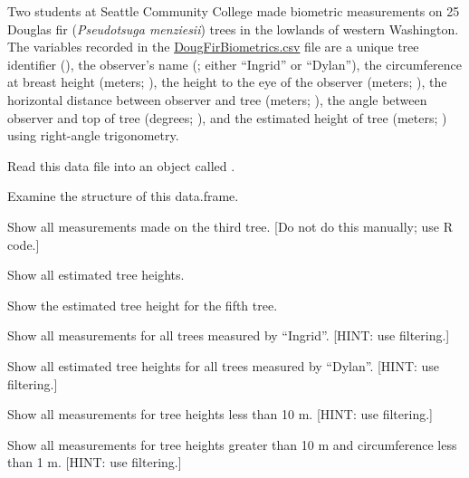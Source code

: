 \documentclass[10pt,openany]{book}\usepackage[]{graphicx}\usepackage[]{color}
\begin{document}

\begin{exsection}
  \item \label{revex:BasicsDataFrame1} \rhw{} Two students at Seattle Community College made biometric measurements on 25 Douglas fir (\emph{Pseudotsuga menziesii}) trees in the lowlands of western Washington.  The variables recorded in the \href{https://raw.githubusercontent.com/droglenc/NCData/master/DougFirBiometrics.csv}{DougFirBiometrics.csv} file are a unique tree identifier (), the observer's name (; either ``Ingrid'' or ``Dylan''), the circumference at breast height (meters; ), the height to the eye of the observer (meters; ), the horizontal distance between observer and tree (meters; ), the angle between observer and top of tree (degrees; ), and the estimated height of tree (meters; ) using right-angle trigonometry. 
  \begin{Enumerate}
    \item Read this data file into an object called .
    \item Examine the structure of this data.frame.
    \item Show all measurements made on the third tree. [Do not do this manually; use R code.]
    \item Show all estimated tree heights.
    \item Show the estimated tree height for the fifth tree.
    \item Show all measurements for all trees measured by ``Ingrid''.  [HINT: use filtering.]
    \item Show all estimated tree heights for all trees measured by ``Dylan''.  [HINT: use filtering.]
    \item Show all measurements for tree heights less than 10 m.  [HINT: use filtering.]
    \item Show all measurements for tree heights greater than 10 m and circumference less than 1 m.  [HINT: use filtering.]
  \end{Enumerate}
\end{exsection}
\end{document}
